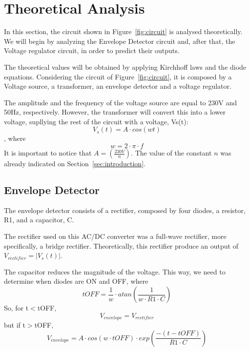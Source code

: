 \section{Theoretical Analysis}
\label{sec:analysis}

In this section, the circuit shown in Figure~\ref{fig:circuit} is analysed
theoretically. We will begin by analyzing the Envelope Detector circuit and, after that, the Voltage regulator circuit, in order to predict their outputs.

The theoretical values will be obtained by applying Kirchhoff laws and the diode equations.
Considering the circuit of Figure~\ref{fig:circuit}, it is composed by a Voltage source, a transformer, an envelope detector and a voltage regulator.

The amplitude and the frequency of the voltage source are equal to 230V and 50Hz, respectively. However, the transformer will convert this into a lower voltage, supllying the rest of the circuit with a voltage, Vs(t):
\begin{equation}
  V_s(t)= A \cdot cos(wt)
  \label{eq:Vs(t)}
\end{equation}
, where
\begin{equation}
  w= 2 \cdot \pi \cdot f
\end{equation}
It is important to notice that $A=(\frac{230V}{n})$. The value of the constant $n$ was already indicated on Section~\ref{sec:introduction}.

\subsection{Envelope Detector}
The envelope detector consists of a rectifier, composed by four diodes, a resistor, R1, and a capacitor, C.

The rectifier used on this AC/DC converter was a full-wave rectifier, more specifically, a bridge rectifier. Theoretically, this rectifier produce an output of $V_{rectifier}=|V_s(t)|$.

The capacitor reduces the magnitude of the voltage. This way, we need to determine when diodes are ON and OFF, where
\begin{equation}
  tOFF = \frac{1}{w}\cdot atan(\frac{1}{w\cdot R1\cdot C})
\end{equation}
So, for t$<$tOFF,
\begin{equation}
  V_{envelope}=V_{rectifier}
\end{equation} 
but if t$>$tOFF,
\begin{equation}
  V_{envelope} = A\cdot cos(w \cdot tOFF)\cdot exp(\frac{-(t-tOFF)}{R1\cdot C})
\end{equation} 

